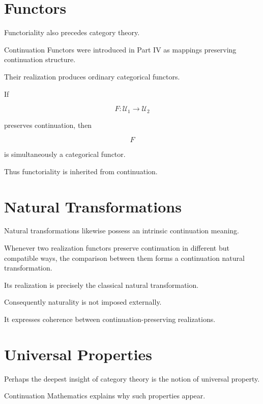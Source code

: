 \documentclass[13pt,openany]{book}
\theoremstyle{plain}
\theoremstyle{definition}
\begin{document}
\section{Functors}

Functoriality also precedes category theory.

Continuation Functors were introduced in Part IV as mappings preserving
continuation structure.

Their realization produces ordinary categorical functors.

If

\[
F:\mathcal U_1\rightarrow\mathcal U_2
\]

preserves continuation, then

\[
F
\]

is simultaneously a categorical functor.

Thus functoriality is inherited from continuation.

\section{Natural Transformations}

Natural transformations likewise possess an intrinsic continuation meaning.

Whenever two realization functors preserve continuation in different but
compatible ways, the comparison between them forms a continuation natural
transformation.

Its realization is precisely the classical natural transformation.

Consequently naturality is not imposed externally.

It expresses coherence between continuation-preserving realizations.

\section{Universal Properties}

Perhaps the deepest insight of category theory is the notion of universal
property.

Continuation Mathematics explains why such properties appear.
\end{document}
